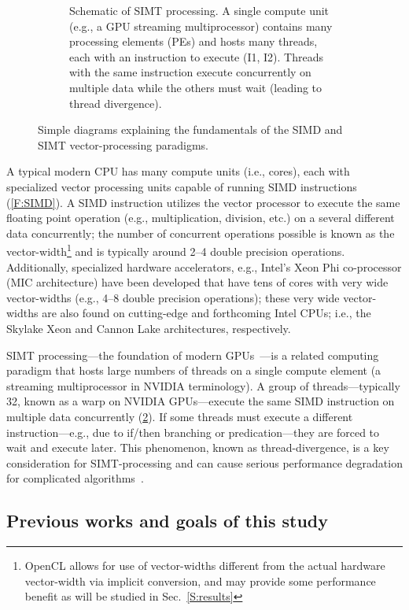 \documentclass[12pt,number,sort&compress,preprint]{elsarticle}
\begin{document}
\begin{figure}[htb]
\begin{subfigure}[t]{0.45\linewidth}
      \caption{Schematic of SIMT processing. A single compute unit (e.g., a GPU streaming multiprocessor) contains many processing elements (PEs) and hosts many threads, each with an instruction to execute (I1, I2).  Threads with the same instruction execute concurrently on multiple data while the others must wait (leading to thread divergence).}
      \label{F:SIMT}
  \end{subfigure}
  \caption{Simple diagrams explaining the fundamentals of the SIMD and SIMT vector-processing paradigms.}
\end{figure}

A typical modern CPU has many compute units (i.e., cores), each with specialized vector processing units capable of running SIMD instructions (\cref{F:SIMD}).
A SIMD instruction utilizes the vector processor to execute the same floating point operation (e.g., multiplication, division, etc.) on a several different data concurrently; the number of concurrent operations possible is known as the vector-width\footnote{OpenCL allows for use of vector-widths different from the actual hardware vector-width via implicit conversion, and may provide some performance benefit as will be studied in Sec.~\ref{S:results}} and is typically around 2--4 double precision operations.
Additionally, specialized hardware accelerators, e.g., Intel's Xeon Phi co-processor (MIC architecture) have been developed that have tens of cores with very wide vector-widths (e.g., \numrange{4}{8} double precision operations); these very wide vector-widths are also found on cutting-edge and forthcoming Intel CPUs; i.e., the Skylake Xeon and Cannon Lake architectures, respectively.

SIMT processing---the foundation of modern GPUs~\cite{lindholm2008nvidia}---is a related computing paradigm that hosts large numbers of threads on a single compute element (a streaming multiprocessor in NVIDIA terminology).
A group of threads---typically \num{32}, known as a warp on NVIDIA GPUs---execute the same SIMD instruction on multiple data concurrently (\cref{F:SIMT}).
If some threads must execute a different instruction---e.g., due to if\slash then branching or predication---they are forced to wait and execute later.
This phenomenon, known as thread-divergence, is a key consideration for SIMT-processing and can cause serious performance degradation for complicated algorithms~\cite{CurtisGPU:2017}.

\subsection{Previous works and goals of this study}
\label{S:Goals}
\end{document}
